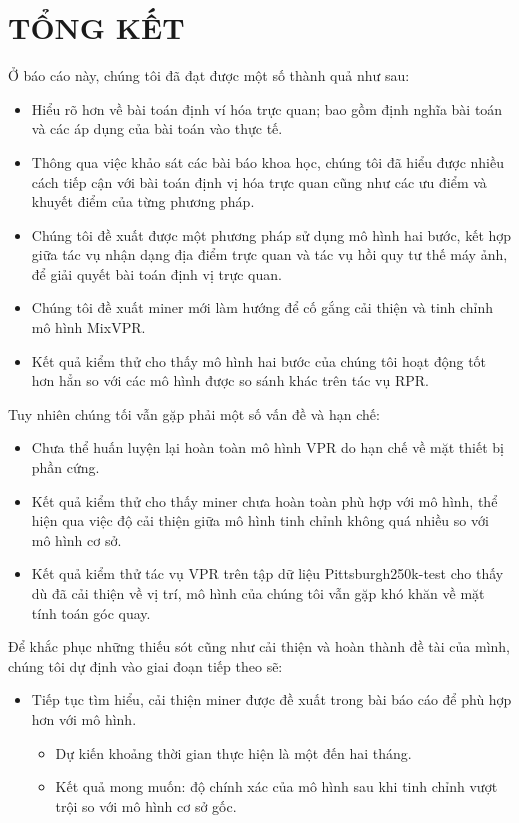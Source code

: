 \chapter{TỔNG KẾT}

Ở báo cáo này, chúng tôi đã đạt được một số thành quả như sau:
\begin{itemize}
	\item Hiểu rõ hơn về bài toán định ví hóa trực quan; bao gồm định nghĩa bài toán và các áp dụng của bài toán vào thực tế.
	\item Thông qua việc khảo sát các bài báo khoa học, chúng tôi đã hiểu được nhiều cách tiếp cận với bài toán định vị hóa trực quan cũng như các ưu điểm và khuyết điểm của từng phương pháp.
	\item Chúng tôi đề xuất được một phương pháp sử dụng mô hình hai bước, kết hợp giữa tác vụ nhận dạng địa điểm trực quan và tác vụ hồi quy tư thế máy ảnh, để giải quyết bài toán định vị trực quan.
	\item Chúng tôi đề xuất miner mới làm hướng để cố gắng cải thiện và tinh chỉnh mô hình MixVPR.
	\item Kết quả kiểm thử cho thấy mô hình hai bước của chúng tôi hoạt động tốt hơn hẳn so với các mô hình được so sánh khác trên tác vụ RPR.
\end{itemize}

Tuy nhiên chúng tối vẫn gặp phải một số vấn đề và hạn chế:
\begin{itemize}
	\item Chưa thể huấn luyện lại hoàn toàn mô hình VPR do hạn chế về mặt thiết bị phần cứng.
	\item Kết quả kiểm thử cho thấy miner chưa hoàn toàn phù hợp với mô hình, thể hiện qua việc độ cải thiện giữa mô hình tinh chỉnh không quá nhiều so với mô hình cơ sở.
	\item Kết quả kiểm thử tác vụ VPR trên tập dữ liệu Pittsburgh250k-test cho thấy dù đã cải thiện về vị trí, mô hình của chúng tôi vẫn gặp khó khăn về mặt tính toán góc quay.
\end{itemize}

Để khắc phục những thiếu sót cũng như cải thiện và hoàn thành đề tài của mình, chúng tôi dự định vào giai đoạn tiếp theo sẽ:
\begin{itemize}
	\item Tiếp tục tìm hiểu, cải thiện miner được đề xuất trong bài báo cáo để phù hợp hơn với mô hình.
	      \begin{itemize}
		      \item Dự kiến khoảng thời gian thực hiện là một đến hai tháng.
		      \item Kết quả mong muốn: độ chính xác của mô hình sau khi tinh chỉnh vượt trội so với mô hình cơ sở gốc.
	      \end{itemize}
\end{itemize}
